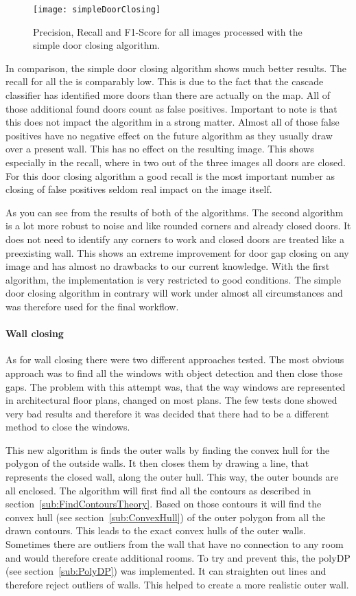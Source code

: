 \begin{figure}[H]
	\centering
	\texttt{[image: simpleDoorClosing]}
	\caption{Precision, Recall and F1-Score for all images processed with the simple door closing algorithm. }
	\label{fig:simpleDoorClosing}
\end{figure}

In comparison, the simple door closing algorithm shows much better results. The recall for all the is comparably low. This is due to the fact that the cascade classifier has identified more doors than there are actually on the map. All of those additional found doors count as false positives. Important to note is that this does not impact the algorithm in a strong matter. Almost all of those false positives have no negative effect on the future algorithm as they usually draw over a present wall. This has no effect on the resulting image. This shows especially in the recall, where in two out of the three images all doors are closed.
For this door closing algorithm a good recall is the most important number as closing of false positives seldom real impact on the image itself.

As you can see from the results of both of the algorithms. The second algorithm is a lot more robust to noise and like rounded corners and already closed doors. It does not need to identify any corners to work and closed doors are treated like a preexisting wall. This shows an extreme improvement for door gap closing on any image and has almost no drawbacks to our current knowledge. With the first algorithm, the implementation is very restricted to good conditions. The simple door closing algorithm in contrary will work under almost all circumstances and was therefore used for the final workflow.

\paragraph{Wall closing}
\label{sub:WallClosing}
As for wall closing there were two different approaches tested. The most obvious approach was to find all the windows with object detection and then close those gaps. The problem with this attempt was, that the way windows are represented in architectural floor plans, changed on most plans. The few tests done showed very bad results and therefore it was decided that there had to be a different method to close the windows.

This new algorithm is finds the outer walls by finding the convex hull for the polygon of the outside walls. It then closes them by drawing a line, that represents the closed wall, along the outer hull. This way, the outer bounds are all enclosed.
The algorithm will first find all the contours as described in section~\ref{sub:FindContoursTheory}. Based on those contours it will find the convex hull (see section~\ref{sub:ConvexHull}) of the outer polygon from all the drawn contours. This leads to the exact convex hulls of the outer walls. Sometimes there are outliers from the wall that have no connection to any room and would therefore create additional rooms. To try and prevent this, the polyDP (see section~\ref{sub:PolyDP}) was implemented. It can straighten out lines and therefore reject outliers of walls. This helped to create a more realistic outer wall.
